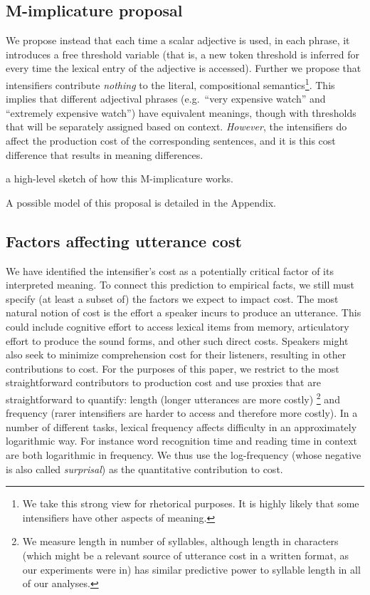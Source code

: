 \documentclass[10pt,letterpaper]{article}
\newcommand{\todo}[1]{{\color{red}#1}}
\begin{document}
\subsection{M-implicature proposal}

We propose instead that each time a scalar adjective is used, in each phrase, it introduces a free threshold variable (that is, a new token threshold is inferred for every time the lexical entry of the adjective is accessed). Further we propose that intensifiers contribute \emph{nothing} to the literal, compositional semantics\footnote{We take this strong view for rhetorical purposes. It is highly likely that some intensifiers have other aspects of meaning.}. This implies that different adjectival phrases (e.g.~``very expensive watch'' and ``extremely expensive watch'') have equivalent meanings, though with thresholds that will be separately assigned based on context. \emph{However}, the intensifiers do affect the production cost of the corresponding sentences, and it is this cost difference that results in meaning differences.

\todo{a high-level sketch of how this M-implicature works.}

A possible model of this proposal is detailed in the Appendix.

\subsection{Factors affecting utterance cost}

We have identified the intensifier's cost as a potentially critical factor of its interpreted meaning. To connect this prediction to empirical facts, we still must specify (at least a subset of) the factors we expect to impact cost.
The most natural notion of cost is the effort a speaker incurs to produce an utterance. This could include cognitive effort to access lexical items from memory, articulatory effort to produce 
the sound forms, and other such direct costs.
Speakers might also seek to minimize comprehension cost for their listeners, resulting in other contributions to cost. 
For the purposes of this paper, we restrict to the most
straightforward contributors to production cost and use proxies that are straightforward to quantify: length (longer utterances are more costly)
\footnote{We measure length in number of syllables, although length in characters (which might be a relevant source of utterance cost in a written format, as our experiments were in) has similar predictive power to syllable length in all of our analyses.}
and frequency (rarer intensifiers are harder to access and therefore more costly).
In a number of different tasks, lexical frequency affects difficulty in an approximately logarithmic way. For instance word recognition time \cite{McCusker1977} 
and reading time in context \cite{smithLevy} are both logarithmic in frequency. We thus use the log-frequency (whose negative is also called \emph{surprisal}) as the quantitative contribution to cost.
\end{document}
